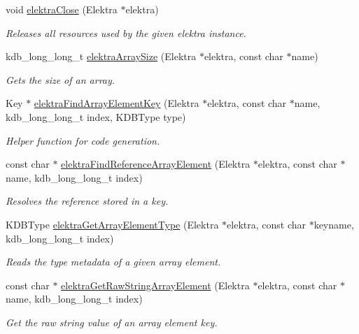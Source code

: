 \begin{DoxyCompactItemize}
void \hyperlink{group__highlevel_ga9b688b7250e5f9d8ea6701cc2cc269af}{elektra\+Close} (Elektra $\ast$elektra)
\begin{DoxyCompactList}\small\item\em Releases all resources used by the given elektra instance. \end{DoxyCompactList}\item 
kdb\+\_\+long\+\_\+long\+\_\+t \hyperlink{group__highlevel_gaf0413286c6faebdc951b739924111909}{elektra\+Array\+Size} (Elektra $\ast$elektra, const char $\ast$name)
\begin{DoxyCompactList}\small\item\em Gets the size of an array. \end{DoxyCompactList}\item 
Key $\ast$ \hyperlink{group__highlevel_gac822ee43ab690e671ed47129a8b47cdc}{elektra\+Find\+Array\+Element\+Key} (Elektra $\ast$elektra, const char $\ast$name, kdb\+\_\+long\+\_\+long\+\_\+t index, K\+D\+B\+Type type)
\begin{DoxyCompactList}\small\item\em Helper function for code generation. \end{DoxyCompactList}\item 
const char $\ast$ \hyperlink{group__highlevel_ga16e022b631da118ca67901495029a844}{elektra\+Find\+Reference\+Array\+Element} (Elektra $\ast$elektra, const char $\ast$name, kdb\+\_\+long\+\_\+long\+\_\+t index)
\begin{DoxyCompactList}\small\item\em Resolves the reference stored in a key. \end{DoxyCompactList}\item 
K\+D\+B\+Type \hyperlink{group__highlevel_ga295b4302c968c7285bc4dc1307c0e2cf}{elektra\+Get\+Array\+Element\+Type} (Elektra $\ast$elektra, const char $\ast$keyname, kdb\+\_\+long\+\_\+long\+\_\+t index)
\begin{DoxyCompactList}\small\item\em Reads the type metadata of a given array element. \end{DoxyCompactList}\item 
const char $\ast$ \hyperlink{group__highlevel_ga1b704f49a8e87262b670cd191ba61bb3}{elektra\+Get\+Raw\+String\+Array\+Element} (Elektra $\ast$elektra, const char $\ast$name, kdb\+\_\+long\+\_\+long\+\_\+t index)
\begin{DoxyCompactList}\small\item\em Get the raw string value of an array element key. \end{DoxyCompactList}\item 

\end{DoxyCompactItemize}
